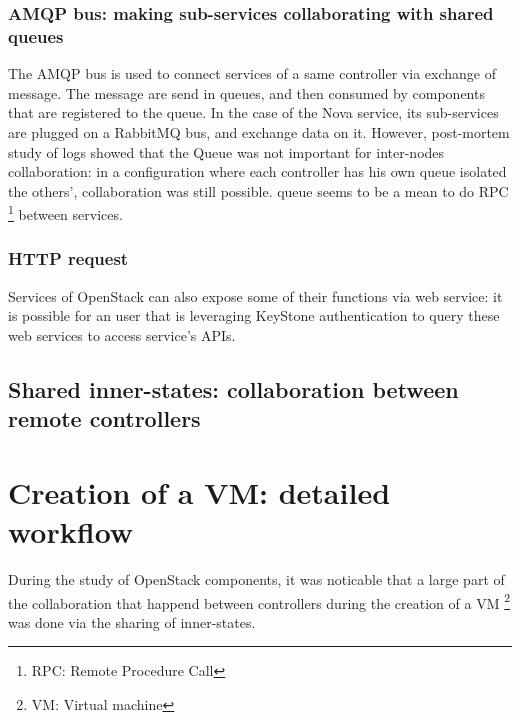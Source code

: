 \subsubsection{AMQP bus: making sub-services collaborating with shared queues}

The AMQP bus is used to connect services of a same controller via exchange of
message. The message are send in queues, and then consumed by components that
are registered to the queue. In the case of the Nova service, its sub-services
are plugged on a RabbitMQ bus, and exchange data on it. However, post-mortem
study of logs showed that the Queue was not important for inter-nodes
collaboration: in a configuration where each controller has his own queue
isolated the others', collaboration was still possible. queue seems to be a mean
to do RPC \footnote{RPC: Remote Procedure Call} between services.


\subsubsection{HTTP request}

Services of OpenStack can also expose some of their functions via web service:
it is possible for an user that is leveraging KeyStone authentication to query
these web services to access service's APIs.

\subsection{Shared inner-states: collaboration between remote controllers}


\section{Creation of a VM: detailed workflow}

During the study of OpenStack components, it was noticable that a large part of
the collaboration that happend between controllers during the creation of a VM
\footnote{VM: Virtual machine} was done via the sharing of inner-states.

